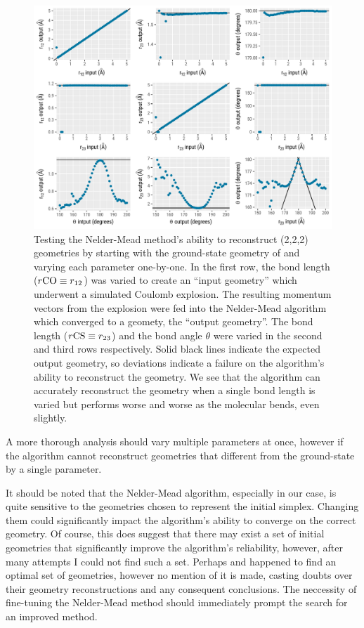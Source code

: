 \begin{figure}
  \centering
  \includegraphics[width=\textwidth]{Plots/OCSSimplexCalibrationPlots}
  \caption[Testing the Nelder-Mead method's ability to reconstruct  (2,2,2) geometries.]
  {Testing the Nelder-Mead method's ability to reconstruct  (2,2,2) geometries by starting with the ground-state geometry of  and varying each parameter one-by-one. In the first row, the  bond length ($r{\textnormal{CO}}\equiv r_{12}$) was varied to create an ``input geometry'' which underwent a simulated Coulomb explosion. The resulting momentum vectors from the explosion were fed into the Nelder-Mead algorithm which converged to a geomety, the ``output geometry''. The  bond length ($r{\textnormal{CS}}\equiv r_{23}$) and the bond angle $\theta$ were varied in the second and third rows respectively. Solid black lines indicate the expected output geometry, so deviations indicate a failure on the algorithm's ability to reconstruct the geometry. We see that the algorithm can accurately reconstruct the geometry when a single bond length is varied but performs worse and worse as the molecular bends, even slightly.}
  \label{fig:OCSSimplexCalibrationPlots}
\end{figure}

A more thorough analysis should vary multiple parameters at once, however if the algorithm cannot reconstruct geometries that different from the ground-state by a single parameter.

It should be noted that the Nelder-Mead algorithm, especially in our case, is quite sensitive to the geometries chosen to represent the initial simplex. Changing them could significantly impact the algorithm's ability to converge on the correct geometry. Of course, this does suggest that there may exist a set of initial geometries that significantly improve the algorithm's reliability, however, after many attempts I could not find such a set. Perhaps \citet{Brichta07} and \citet{Bocharova11} happened to find an optimal set of geometries, however no mention of it is made, casting doubts over their geometry reconstructions and any consequent conclusions. The neccessity of fine-tuning the Nelder-Mead method should immediately prompt the search for an improved method.

